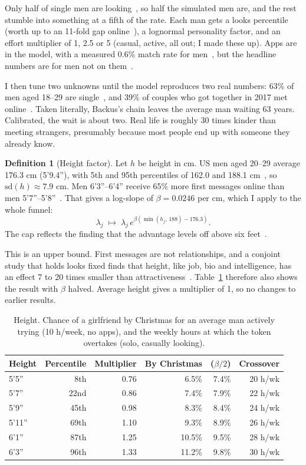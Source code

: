 \documentclass[11pt]{article}
\theoremstyle{definition}
\newtheorem{definition}{Definition}[section]
\theoremstyle{plain}
\begin{document}
Only half of single men are looking~\cite{pew23}, so half the simulated men are, and the rest stumble into something at a fifth of the rate. Each man gets a looks percentile (worth up to an 11-fold gap online~\cite{okc}), a lognormal personality factor, and an effort multiplier of 1, 2.5 or 5 (casual, active, all out; I made these up). Apps are in the model, with a measured 0.6\% match rate for men~\cite{tyson}, but the headline numbers are for men not on them~\cite{pewod}.

I then tune two unknowns until the model reproduces two real numbers: 63\% of men aged 18--29 are single~\cite{pew23}, and 39\% of couples who got together in 2017 met online~\cite{hcmst}. Taken literally, Backus's chain leaves the average man waiting 63 years. Calibrated, the wait is about two. Real life is roughly 30 times kinder than meeting strangers, presumably because most people end up with someone they already know.

\begin{definition}[Height factor]
Let $h$ be height in cm. US men aged 20--29 average 176.3 cm (5'9.4''), with 5th and 95th percentiles of 162.0 and 188.1 cm~\cite{nhanes}, so $\mathrm{sd}(h) \approx 7.9$ cm. Men 6'3''--6'4'' receive 65\% more first messages online than men 5'7''--5'8''~\cite{hitsch}. That gives a log-slope of $\beta = 0.0246$ per cm, which I apply to the whole funnel:
\[
\lambda_j \;\mapsto\; \lambda_j\, e^{\beta(\min(h_j,\,188) - 176.3)}.
\]
The cap reflects the finding that the advantage levels off above six feet~\cite{hensley}.
\end{definition}

This is an upper bound. First messages are not relationships, and a conjoint study that holds looks fixed finds that height, like job, bio and intelligence, has an effect 7 to 20 times smaller than attractiveness~\cite{witmer}. Table~\ref{tab:height} therefore also shows the result with $\beta$ halved. Average height gives a multiplier of 1, so no changes to earlier results.

\begin{table}[!htbp]
\centering\small
\caption{Height. Chance of a girlfriend by Christmas for an average man actively trying (10 h/week, no apps), and the weekly hours at which the token overtakes (solo, casually looking).}
\label{tab:height}
\begin{tabular}{lrrrrr}
\toprule
Height & Percentile & Multiplier & By Christmas & ($\beta/2$) & Crossover \\
\midrule
5'5'' & 8th & 0.76 & 6.5\% & 7.4\% & 20 h/wk \\
5'7'' & 22nd & 0.86 & 7.4\% & 7.9\% & 22 h/wk \\
5'9'' & 45th & 0.98 & 8.3\% & 8.4\% & 24 h/wk \\
5'11'' & 69th & 1.10 & 9.3\% & 8.9\% & 26 h/wk \\
6'1'' & 87th & 1.25 & 10.5\% & 9.5\% & 28 h/wk \\
6'3'' & 96th & 1.33 & 11.2\% & 9.8\% & 30 h/wk \\
\bottomrule
\end{tabular}
\end{table}
\end{document}
